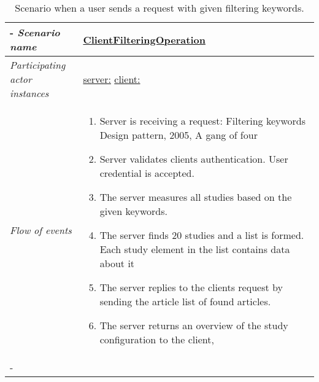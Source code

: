 \begin{table}[h!]

	\tabulinesep=1.5mm
	
	\begin{tabu} to 
	
		\tabucline[1.5pt]-
		\textit{Scenario name} & \underline{ClientFilteringOperation} \\
		\hline
		\textit{Participating actor 
		\newline instances} & \underline{server:\serverside}
		\newline \underline{client:\clientside} \\
		\hline
		\textit{Flow of events} &
		\vspace{-3mm}
		
		\begin{enumerate}[leftmargin=*,topsep=0pt,itemsep=-1ex]
		
			\item Server is receiving a request: Filtering keywords {Design pattern, 2005, A gang of four}
			
			\item Server validates clients authentication. User credential is accepted.
			
			\item The server measures all studies based on the given keywords.
			
			\item The server finds 20 studies and a list is formed. Each study element in the list contains data about it
			
			\item The server replies to the clients request by sending the article list of found articles.
			
			\item The server returns an overview of the study configuration to the client, 
		
		\end{enumerate} 
		
		\\
		\tabucline[1.5pt]-
		
	\end{tabu}
		\caption{Scenario when a user sends a request with given filtering keywords.}
		\label{sc:ClientFilteringOperation}
		
\end{table}

